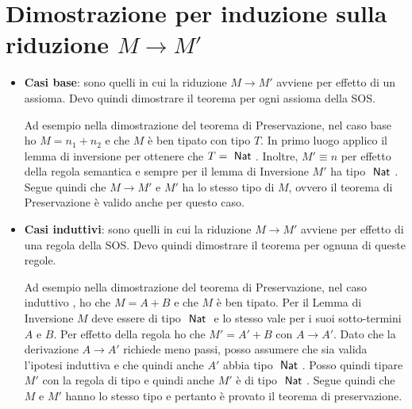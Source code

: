 \section{Dimostrazione per induzione sulla riduzione $M\to M'$}

\begin{itemize}
	\item \textbf{Casi base}: sono quelli in cui la riduzione $M \to M'$ avviene per effetto di un assioma. Devo quindi dimostrare il teorema per ogni assioma della SOS.
	
	Ad esempio nella dimostrazione del teorema di Preservazione, nel caso base  ho $M = n_1 + n_2$ e che $M$ è ben tipato con tipo $T$. In primo luogo applico il lemma di inversione per ottenere che $T = \Nat$. 
	Inoltre, $M' \equiv n$ per effetto della regola semantica  e sempre per il lemma di Inversione $M'$ ha tipo $\Nat$. Segue quindi che $M\to M'$ e $M'$ ha lo stesso tipo di $M$, ovvero il teorema di Preservazione è valido anche per questo caso.
	
	\item \textbf{Casi induttivi}: sono quelli in cui la riduzione $M \to M'$ avviene per effetto di una regola della SOS. Devo quindi dimostrare il teorema per ognuna di queste regole.
	
	Ad esempio nella dimostrazione del teorema di Preservazione, nel caso induttivo , ho che $M = A + B$ e che $M$ è ben tipato. Per il Lemma di Inversione $M$ deve essere di tipo $\Nat$ e lo stesso vale per i suoi sotto-termini $A$ e $B$. 
	Per effetto della regola  ho che $M' = A' +B$ con $A \to A'$.
	Dato che la derivazione $A \to A'$ richiede meno passi, posso assumere che sia valida l'ipotesi induttiva e che quindi anche $A'$ abbia tipo $\Nat$.
	Posso quindi tipare $M'$ con la regola di tipo  e quindi anche $M'$ è di tipo $\Nat$.
	Segue quindi che $M$ e $M'$ hanno lo stesso tipo e pertanto è provato il teorema di preservazione.
\end{itemize}











